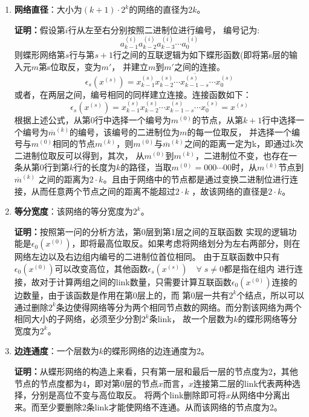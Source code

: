 \documentclass[12pt]{article}
\begin{document}
	\begin{enumerate}
		\item \textbf{网络直径}：大小为$(k+1)\cdot 2^k$的网络的直径为$2k$。
		
		\textbf{证明：}假设第$i$行从左至右分别按照二进制位进行编号，
		编号记为:$${a^{(i)}_{k-1}a^{(i)}_{k-2}a^{(i)}_{k-3}\dotsb a_0^{(i)}}$$ 
		则蝶形网络第$s$行与第$s+1$行之间的互联逻辑为如下蝶形函数(即将第s层的输入元$m$第s位取反，变为$m'$，
		并建立$m$到$m'$之间的连接。
		\begin{equation}
			\epsilon_{s}(x^{(s)})=x^{(s)}_{k-1}x^{(s)}_{k-2}\dotsb \overline{x^{(s)}_{k-1-s}} \dotsb x^{(s)}_{0}
		\end{equation}
		或者，在两层之间，编号相同的同样建立连接。连接函数如下：
		\begin{equation}
			\epsilon_{s}(x^{(s)})=x^{(s)}_{k-1}x^{(s)}_{k-2}\dotsb x^{(s)}_{k-1-s} \dotsb x^{(s)}_{0}=x^{(s)}
		\end{equation}
		根据上述公式，从第0行中选择一个编号为$m^{(0)}$的节点，从第$k+1$行中选择一个编号为$\overline{m}^{(k)} $的编号，该编号的二进制位为$m$的每一位取反，
		并选择一个编号与$m^{(0)}$相同的节点$m^{(k)}$，则$m^{(0)}$与$\overline{m}^{(k)} $之间的距离一定为k，即通过k次二进制位取反可以得到，其次，
		从$m^{(0)}$到$m^{(k)}$，二进制位不变，也存在一条从第0行到第$k$行的长度为$k$的路径，当取$m^{(0)}=000\dotsb00$时，从$m^{(k)}$节点到$\overline{m}^{(k)} $
		之间的距离为$2\cdot k$。且由于网络中的节点都是通过变换二进制位进行连接，从而任意两个节点之间的距离不能超过$2\cdot k$ ，故该网络的直径是$2\cdot k$。
		\item \textbf{等分宽度}：该网络的等分宽度为$2^{k}$。
		
		\textbf{证明：}按照第一问的分析方法，第0层到第1层之间的互联函数
		实现的逻辑功能是$\epsilon_0(x^{(0)})$，即将最高位取反。如果考虑将网络划分为左右两部分，则在网络左边以及右边组内编号的二进制位首位相同。
		由于互联函数中只有$\epsilon_0(x^{(0)})$可以改变高位，其他函数$\epsilon_s(x^{(s)}) \quad \forall \;s \neq 0$都是指在组内
		进行连接，故对于计算两组之间的link数量，只需要计算互联函数$\epsilon_0(x^{(0)})$连接的边数量，由于该函数是作用在第0层上的，而
		第0层一共有$2^{k}$个结点，所以可以通过删除$2^{k}$条边使得网络等分为两个相同节点数的网络。而分割该网络为两个相同大小的子网络，必须至少分割$2^{k}$条link，
		故一个层数为$k$的蝶形网络等分宽度为$2^{k}$。
		\item \textbf{边连通度}：一个层数为$k$的蝶形网络的边连通度为2。
		
		\textbf{证明：}从蝶形网络的构造上来看，只有第一层和最后一层的节点度为2，其他节点的节点度都为4，即对第0层的节点$x$而言，$x$连接第二层的link代表两种选择，分别是高位不变与高位取反。
		将两个link删除即可将$x$从网络中分离出来。而至少要删除2条link才能使网络不连通。从而该网络的节点度为2。
	\end{enumerate}
\newpage
\end{document}
